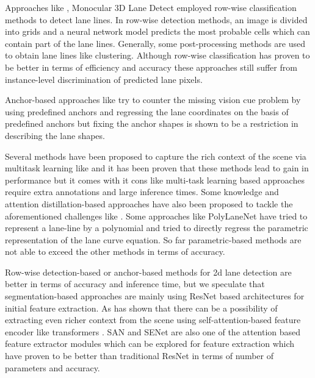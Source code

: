  Approaches like \cite{DBLP:journals/corr/abs-2005-08630}, \cite{DBLP:journals/corr/abs-2004-11757}Monocular 3D Lane Detect employed row-wise classification methods to detect lane lines. In row-wise detection methods, an image is divided into grids and a neural network model predicts the most probable cells which can contain part of the lane lines. Generally, some post-processing methods are used to obtain lane lines like clustering. Although row-wise classification has proven to be better in terms of efficiency and accuracy these approaches still suffer from instance-level discrimination of predicted lane pixels.
 
 Anchor-based approaches like  \cite{https://doi.org/10.48550/arxiv.2010.12035} try to counter the missing vision cue problem by using predefined anchors and regressing the lane coordinates on the basis of predefined anchors but fixing the anchor shapes is shown to be a restriction in describing the lane shapes.

Several methods have been proposed to capture the rich context of the scene via multitask learning like \cite{inbook} and it has been proven that these methods lead to gain in performance but it comes with it cons like multi-task learning based approaches require extra annotations and large inference times. Some knowledge and attention distillation-based approaches have also been proposed to tackle the aforementioned challenges like \cite{DBLP:journals/corr/abs-1908-00821}. Some approaches like PolyLaneNet\cite{DBLP:journals/corr/abs-2004-10924} have tried to represent a lane-line by a polynomial and tried to directly regress the parametric representation of the lane curve equation. So far parametric-based methods are not able to exceed the other methods in terms of accuracy.

Row-wise detection-based or anchor-based methods for 2d lane detection are better in terms of accuracy and inference time, but we speculate that segmentation-based approaches are mainly using ResNet\cite{DBLP:journals/corr/HeZRS15} based architectures for initial feature extraction. As \cite{DBLP:journals/corr/abs-2105-05003} has shown that there can be a possibility of extracting even richer context from the scene using self-attention-based feature encoder like transformers \cite{https://doi.org/10.48550/arxiv.1706.03762}.   SAN\cite{DBLP:journals/corr/abs-2004-13621} and SENet\cite{DBLP:journals/corr/abs-1709-01507} are also one of the attention based feature extractor modules which can be explored for feature extraction which have proven to be better than traditional ResNet\cite{DBLP:journals/corr/HeZRS15} in terms of number of parameters and accuracy. 

